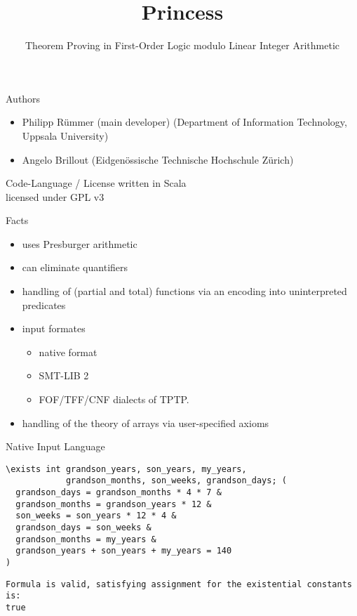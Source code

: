 \documentclass{beamer} %
\title{Princess}
\subtitle{Theorem Proving in First-Order Logic modulo Linear Integer Arithmetic}
\newenvironment{page}[1]
	{\begin{frame}[containsverbatim,c]{#1}}
    	{\end{frame}}
\begin{document}
\maketitle

\begin{page}{Authors}
\begin{itemize}
	\item Philipp Rümmer (main developer) (Department of Information Technology, Uppsala University)
	\item Angelo Brillout (Eidgenössische Technische Hochschule Zürich)
\end{itemize}

\end{page}
\begin{page}{Code-Language / License}
\centering
written in Scala \\

licensed under GPL v3

\end{page}
\begin{page}{Facts}
\begin{itemize}
	\item uses Presburger arithmetic
	\item can eliminate quantifiers
	\item handling of (partial and total) functions via an encoding into uninterpreted predicates
	\item input formates
	\begin{itemize}
		\item native format
		\item SMT-LIB 2 
		\item FOF/TFF/CNF dialects of TPTP.
	\end{itemize}
	\item handling of the theory of arrays via user-specified axioms
\end{itemize}

\end{page}
\begin{page}{Native Input Language}

\begin{lstlisting}
\exists int grandson_years, son_years, my_years,
            grandson_months, son_weeks, grandson_days; (
  grandson_days = grandson_months * 4 * 7 &
  grandson_months = grandson_years * 12 &
  son_weeks = son_years * 12 * 4 &
  grandson_days = son_weeks &
  grandson_months = my_years &
  grandson_years + son_years + my_years = 140
)
\end{lstlisting}
\begin{lstlisting}
Formula is valid, satisfying assignment for the existential constants is:
true
\end{lstlisting}

\end{page}
\end{document}

